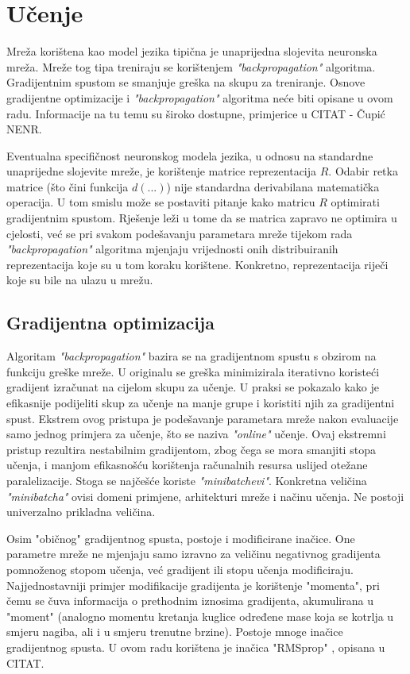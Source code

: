 \documentclass[times, utf8, diplomski, numeric]{fer}
\begin{document}
\section{Učenje}

Mreža korištena kao model jezika tipična je unaprijedna slojevita neuronska mreža. Mreže tog tipa treniraju se korištenjem \textit{"backpropagation"} algoritma. Gradijentnim spustom se smanjuje greška na skupu za treniranje. Osnove gradijentne optimizacije i \textit{"backpropagation"} algoritma neće biti opisane u ovom radu. Informacije na tu temu su široko dostupne, primjerice u CITAT - Čupić NENR.

Eventualna specifičnost neuronskog modela jezika, u odnosu na standardne unaprijedne slojevite mreže, je korištenje matrice reprezentacija $R$. Odabir retka matrice (što čini funkcija $d(...)$) nije standardna derivabilana matematička operacija. U tom smislu može se postaviti pitanje kako matricu $R$ optimirati gradijentnim spustom. Rješenje leži u tome da se matrica zapravo ne optimira u cjelosti, već se pri svakom podešavanju parametara mreže tijekom rada \textit{"backpropagation"} algoritma mjenjaju vrijednosti onih distribuiranih reprezentacija koje su u tom koraku korištene. Konkretno, reprezentacija riječi koje su bile na ulazu u mrežu.

\subsection{Gradijentna optimizacija}
\label{sec:nnet_grad}

Algoritam \textit{"backpropagation"} bazira se na gradijentnom spustu s obzirom na funkciju greške mreže. U originalu se greška minimizirala iterativno koristeći gradijent izračunat na cijelom skupu za učenje. U praksi se pokazalo kako je efikasnije podijeliti skup za učenje na manje grupe  i koristiti njih za gradijentni spust. Ekstrem ovog pristupa je podešavanje parametara mreže nakon evaluacije samo jednog primjera za učenje, što se naziva \textit{"online"} učenje. Ovaj ekstremni pristup rezultira nestabilnim gradijentom, zbog čega se mora smanjiti stopa učenja, i manjom efikasnošću korištenja računalnih resursa uslijed otežane paralelizacije. Stoga se najčešće koriste \textit{"minibatchevi"}. Konkretna veličina \textit{"minibatcha"} ovisi domeni primjene, arhitekturi mreže i načinu učenja. Ne postoji univerzalno prikladna veličina.

Osim "običnog" gradijentnog spusta, postoje i modificirane inačice. One parametre mreže ne mjenjaju samo izravno za veličinu negativnog gradijenta pomnoženog stopom učenja, već gradijent ili stopu učenja modificiraju. Najjednostavniji primjer modifikacije gradijenta je korištenje "momenta", pri čemu se čuva informacija o prethodnim iznosima gradijenta, akumulirana u "moment" (analogno momentu kretanja kuglice određene mase koja se kotrlja u smjeru nagiba, ali i u smjeru trenutne brzine). Postoje mnoge inačice gradijentnog spusta. U ovom radu korištena je inačica "RMSprop" , opisana u CITAT.
\end{document}
